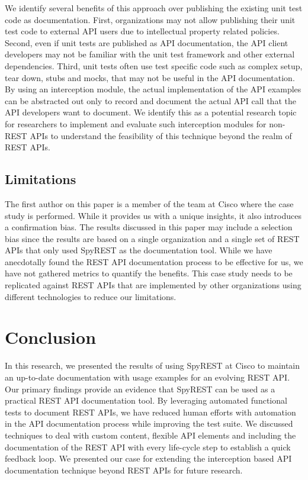 \documentclass[10pt, conference]{IEEEtran}
\begin{document}
We identify several benefits of this approach over publishing the existing unit test code as documentation. First, organizations may not allow publishing their unit test code to external API users due to intellectual property related policies. Second, even if unit tests are published as API documentation, the API client developers may not be familiar with the unit test framework and other external dependencies. Third, unit tests often use test specific code such as complex setup, tear down, stubs and mocks, that may not be useful in the API documentation. By using an interception module, the actual implementation of the API examples can be abstracted out only to record and document the actual API call that the API developers want to document. We identify this as a potential research topic for researchers to implement and evaluate such interception modules for non-REST APIs to understand the feasibility of this technique beyond the realm of REST APIs.

\subsection{Limitations} %

The first author on this paper is a member of the team at Cisco where the case study is performed. While it provides us with a unique insights, it also introduces a confirmation bias. The results discussed in this paper may include a selection bias since the results are based on a single organization and a single set of REST APIs that only used SpyREST as the documentation tool. While we have anecdotally found the REST API documentation process to be effective for us, we have not gathered metrics to quantify the benefits. This case study needs to be replicated against REST APIs that are implemented by other organizations using different technologies to reduce our limitations.

\section{Conclusion}
In this research, we presented the results of using SpyREST at Cisco to maintain an up-to-date documentation with usage examples for an evolving REST API. Our primary findings provide an evidence that SpyREST can be used as a practical REST API documentation tool. By leveraging automated functional tests to document REST APIs, we have reduced human efforts with automation in the API documentation process while improving the test suite. We discussed techniques to deal with custom content, flexible API elements and including the documentation of the REST API with every life-cycle step to establish a quick feedback loop. We presented our case for extending the interception based API documentation technique beyond REST APIs for future research.
\end{document}
